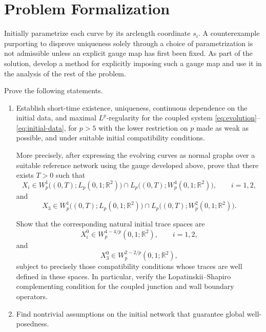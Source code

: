 \documentclass[11pt,a4paper]{article}
\theoremstyle{definition}
\begin{document}
\section{Problem Formalization}

Initially parametrize each curve by its arclength coordinate $s_i$. A
counterexample purporting to disprove uniqueness solely through a choice of
parametrization is not admissible unless an explicit gauge map has first been
fixed. As part of the solution, develop a method for explicitly imposing such
a gauge map and use it in the analysis of the rest of the problem.

Prove the following statements.

\begin{enumerate}
  \item Establish short-time existence, uniqueness, continuous dependence on
  the initial data, and maximal $L^p$-regularity for the coupled system
  \eqref{eq:evolution}--\eqref{eq:initial-data}, for $p>5$ with the lower
  restriction on $p$ made as weak as possible, and under suitable initial
  compatibility conditions.

  More precisely, after expressing the evolving curves as normal graphs over
  a suitable reference network using the gauge developed above, prove that
  there exists $T>0$ such that
  \begin{equation}
    X_i
    \in
    W_p^1\bigl((0,T);L_p(0,1;\mathbb R^2)\bigr)
    \cap
    L_p\bigl((0,T);W_p^4(0,1;\mathbb R^2)\bigr),
    \qquad i=1,2,
  \end{equation}
  and
  \begin{equation}
    X_3
    \in
    W_p^1\bigl((0,T);L_p(0,1;\mathbb R^2)\bigr)
    \cap
    L_p\bigl((0,T);W_p^2(0,1;\mathbb R^2)\bigr).
  \end{equation}

  Show that the corresponding natural initial trace spaces are
  \begin{equation}
    X_i^0\in W_p^{4-4/p}(0,1;\mathbb R^2),
    \qquad i=1,2,
  \end{equation}
  and
  \begin{equation}
    X_3^0\in W_p^{2-2/p}(0,1;\mathbb R^2),
  \end{equation}
  subject to precisely those compatibility conditions whose traces are well
  defined in these spaces. In particular, verify the
  Lopatinskii--Shapiro complementing condition for the coupled junction and
  wall boundary operators.

  \item Find nontrivial assumptions on the initial network that guarantee
  global well-posedness.
\end{enumerate}
\end{document}
